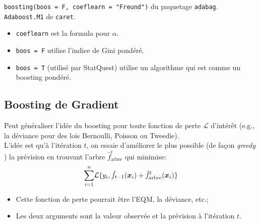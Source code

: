 \documentclass[10pt, french]{article}
\begin{document}
\begin{multicols*}{3}
\begin{definitionNOHFILLsub}
\texttt{boosting(boos = F, coeflearn = "Freund")} du paquetage \texttt{adabag}.\\
\texttt{Adaboost.M1} de \texttt{caret}. 
\begin{itemize}[leftmargin = *]
	\item	\texttt{coeflearn} est la formula pour $\alpha$.
	\item	\texttt{boos = F} utilise l'indice de Gini pondéré.
	\item	\texttt{boos = T} (utilisé par StatQuest) utilise un algorithme qui est comme un boosting pondéré.
\end{itemize}
\end{definitionNOHFILLsub}

\columnbreak

\subsection*{Boosting de Gradient}
Peut généraliser l'idée du boosting pour toute fonction de perte $\mathcal{L}$ d'intérêt (e.g., la déviance pour des lois Bernoulli, Poisson ou Tweedie).\\

L'idée est qu'à l'itération $t$, on essaie d'améliorer le plus possible (de façon \og \textit{greedy} \fg{}) la prévision en trouvant l'arbre $\hat{f}_{\text{arbre}}^{t}$ qui minimise:
	\begin{align*}
	\overset{n}{\underset{i = 1}{\sum}}\mathcal{L}\{y_{i}, \hat{f}_{t - 1}(\bm{x}_{i}) + \hat{f}_{\text{arbre}}^{t}(\bm{x}_{i}) \}
	\end{align*}
\begin{itemize}[leftmargin = *]
	\item	Cette fonction de perte pourrait être l'EQM, la déviance, etc.;
	\item	Les deux arguments sont la valeur observée et la prévision à l'itération $t$.
\end{itemize}


\end{multicols*}
\end{document}
